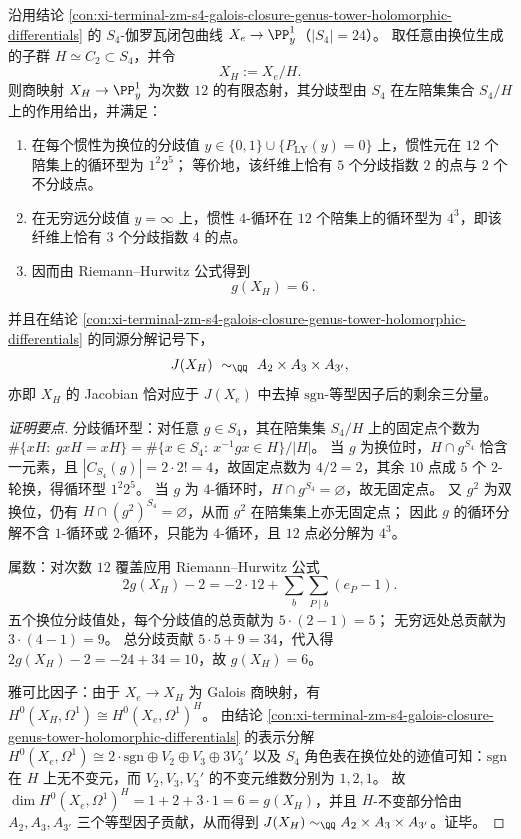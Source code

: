 \begin{conclusion}\label{con:xi-terminal-zm-s4-transposition-quotient-genus6}
沿用结论 \ref{con:xi-terminal-zm-s4-galois-closure-genus-tower-holomorphic-differentials} 的 \(S_4\)-伽罗瓦闭包曲线 \(X_e\to\PP^{1}_{y}\)（\(|S_4|=24\)）。
取任意由换位生成的子群 \(H\simeq C_{2}\subset S_4\)，并令
\[
X_{H}:=X_e/H.
\]
则商映射 \(X_{H}\to\PP^{1}_{y}\) 为次数 \(12\) 的有限态射，其分歧型由 \(S_4\) 在左陪集集合 \(S_4/H\) 上的作用给出，并满足：
\begin{enumerate}
  \item 在每个惯性为换位的分歧值 \(y\in\{0,1\}\cup\{P_{\mathrm{LY}}(y)=0\}\) 上，惯性元在 \(12\) 个陪集上的循环型为 \(1^{2}2^{5}\)；
  等价地，该纤维上恰有 \(5\) 个分歧指数 \(2\) 的点与 \(2\) 个不分歧点。
  \item 在无穷远分歧值 \(y=\infty\) 上，惯性 \(4\)-循环在 \(12\) 个陪集上的循环型为 \(4^{3}\)，即该纤维上恰有 \(3\) 个分歧指数 \(4\) 的点。
  \item 因而由 Riemann--Hurwitz 公式得到
  \[
  \boxed{\ g(X_H)=6\ }.
  \]
\end{enumerate}
并且在结论 \ref{con:xi-terminal-zm-s4-galois-closure-genus-tower-holomorphic-differentials} 的同源分解记号下，
\[
J(X_{H})\ \sim_{\QQ}\ A_{2}\times A_{3}\times A_{3'},
\]
亦即 \(X_H\) 的 Jacobian 恰对应于 \(J(X_e)\) 中去掉 \(\mathrm{sgn}\)-等型因子后的剩余三分量。
\end{conclusion}
\begin{proof}[证明要点]
分歧循环型：对任意 \(g\in S_4\)，其在陪集集 \(S_4/H\) 上的固定点个数为
\(
\#\{xH:\ gxH=xH\}=\#\{x\in S_4:\ x^{-1}gx\in H\}/|H|
\)。
当 \(g\) 为换位时，\(H\cap g^{S_4}\) 恰含一元素，且 \(|C_{S_4}(g)|=2\cdot 2!=4\)，故固定点数为 \(4/2=2\)，其余 \(10\) 点成 \(5\) 个 \(2\)-轮换，得循环型 \(1^{2}2^{5}\)。
当 \(g\) 为 \(4\)-循环时，\(H\cap g^{S_4}=\varnothing\)，故无固定点。
又 \(g^{2}\) 为双换位，仍有 \(H\cap (g^{2})^{S_4}=\varnothing\)，从而 \(g^{2}\) 在陪集集上亦无固定点；
因此 \(g\) 的循环分解不含 \(1\)-循环或 \(2\)-循环，只能为 \(4\)-循环，且 \(12\) 点必分解为 \(4^{3}\)。
\par
属数：对次数 \(12\) 覆盖应用 Riemann--Hurwitz 公式
\[
2g(X_H)-2=-2\cdot 12+\sum_{b}\sum_{P\mid b}(e_P-1).
\]
五个换位分歧值处，每个分歧值的总贡献为 \(5\cdot(2-1)=5\)；
无穷远处总贡献为 \(3\cdot(4-1)=9\)。
总分歧贡献 \(5\cdot 5+9=34\)，代入得 \(2g(X_H)-2=-24+34=10\)，故 \(g(X_H)=6\)。
\par
雅可比因子：由于 \(X_e\to X_H\) 为 Galois 商映射，有
\(
H^{0}(X_H,\Omega^{1})\cong H^{0}(X_e,\Omega^{1})^{H}
\)。
由结论 \ref{con:xi-terminal-zm-s4-galois-closure-genus-tower-holomorphic-differentials} 的表示分解
\(
H^{0}(X_e,\Omega^{1})\cong 2\cdot \mathrm{sgn}\oplus V_2\oplus V_3\oplus 3V_3'
\)
以及 \(S_4\) 角色表在换位处的迹值可知：\(\mathrm{sgn}\) 在 \(H\) 上无不变元，而 \(V_2,V_3,V_3'\) 的不变元维数分别为 \(1,2,1\)。
故
\(
\dim H^{0}(X_e,\Omega^{1})^{H}=1+2+3\cdot 1=6=g(X_H)
\)，并且 \(H\)-不变部分恰由 \(A_2,A_3,A_{3'}\) 三个等型因子贡献，从而得到 \(J(X_H)\sim_{\QQ}A_2\times A_3\times A_{3'}\)。证毕。
\end{proof}

\endinput
